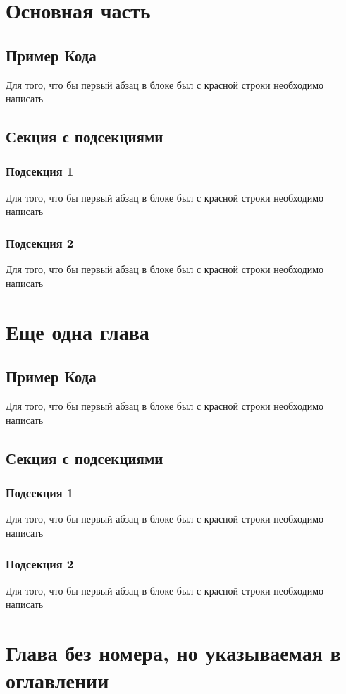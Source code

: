 \chapter{Основная часть}
\section{Пример Кода}
\noindent\indent Для того, что бы первый абзац в блоке был с красной строки необходимо написать 
\section{Секция с подсекциями}
\subsection{Подсекция 1}
\noindent\indent Для того, что бы первый абзац в блоке был с красной строки необходимо написать 
\subsection{Подсекция 2}
\noindent\indent Для того, что бы первый абзац в блоке был с красной строки необходимо написать 

\chapter{Еще одна глава}
\section{Пример Кода}
\noindent\indent Для того, что бы первый абзац в блоке был с красной строки необходимо написать 
\section{Секция с подсекциями}
\subsection{Подсекция 1}
\noindent\indent Для того, что бы первый абзац в блоке был с красной строки необходимо написать 
\subsection{Подсекция 2}
\noindent\indent Для того, что бы первый абзац в блоке был с красной строки необходимо написать 

\chapter*{Глава без номера, но указываемая в оглавлении}
